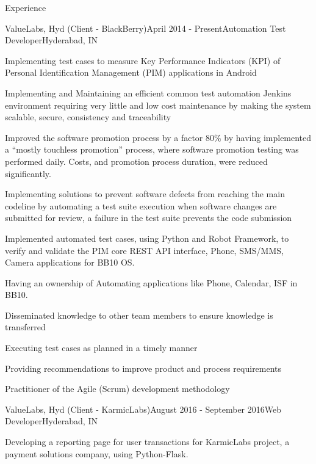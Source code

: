 \documentclass{resume}
\begin{document}
  \begin{rSection}{Experience}
  
    \begin{rSubsection}{ValueLabs, Hyd (Client - BlackBerry)}{April 2014 - Present}{Automation Test Developer}{Hyderabad, IN}
    \item Implementing test cases to measure Key Performance Indicators (KPI) of Personal Identification Management (PIM) applications in Android
    \item Implementing and Maintaining an efficient common test automation Jenkins environment requiring very little and low cost maintenance by making the system scalable, secure, consistency and traceability 
    \item Improved the software promotion process by a factor 80\% by having implemented a “mostly touchless promotion” process, where software promotion testing was performed daily. Costs, and promotion process duration, were reduced significantly.
    \item Implementing solutions to prevent software defects from reaching the main codeline by automating a test suite execution when software changes are submitted for review, a failure in the test suite prevents the code submission
    \item Implemented automated test cases, using Python and Robot Framework, to verify and validate the PIM core REST API interface, Phone, SMS/MMS, Camera applications for BB10 OS.
    \item Having an ownership of Automating applications like Phone, Calendar, ISF in BB10.
    \item Disseminated knowledge to other team members to ensure knowledge is transferred
    \item Executing test cases as planned in a timely manner
    \item Providing recommendations to improve product and process requirements
    \item Practitioner of the Agile (Scrum) development methodology
    \end{rSubsection}
    
    \begin{rSubsection}{ValueLabs, Hyd (Client - KarmicLabs)}{August 2016 - September 2016}{Web Developer}{Hyderabad, IN}
    \item Developing a reporting page for user transactions for KarmicLabs project, a payment solutions company, using Python-Flask.
    \end{rSubsection}
    

\end{rSection}
\end{document}
